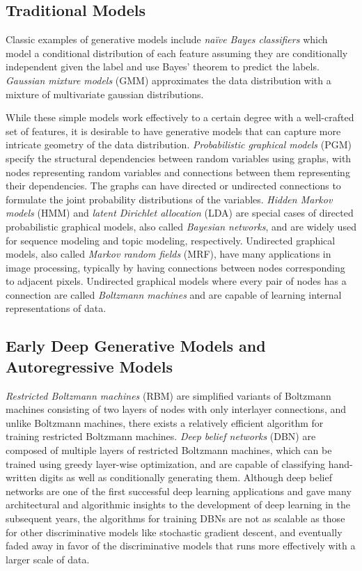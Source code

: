 \subsection{Traditional Models}

Classic examples of generative models include \emph{na\"{i}ve Bayes classifiers} \cite{maron1961naive} which model a conditional distribution of each feature assuming they are conditionally independent given the label and use Bayes' theorem to predict the labels.
\emph{Gaussian mixture models} (GMM) \cite{everitt1981mixture} approximates the data distribution with a mixture of multivariate gaussian distributions.

While these simple models work effectively to a certain degree with a well-crafted set of features, it is desirable to have generative models that can capture more intricate geometry of the data distribution.
\emph{Probabilistic graphical models} (PGM) specify the structural dependencies between random variables using graphs, with nodes representing random variables and connections between them representing their dependencies.
The graphs can have directed or undirected connections to formulate the joint probability distributions of the variables.
\emph{Hidden Markov models} (HMM) \cite{rabiner1989hmm} and \emph{latent Dirichlet allocation} (LDA) \cite{blei2003lda} are special cases of directed probabilistic graphical models, also called \emph{Bayesian networks}, and are widely used for sequence modeling and topic modeling, respectively.
Undirected graphical models, also called \emph{Markov random fields} (MRF), have many applications in image processing, typically by having connections between nodes corresponding to adjacent pixels.
Undirected graphical models where every pair of nodes has a connection are called \emph{Boltzmann machines} and are capable of learning internal representations of data.

\subsection{Early Deep Generative Models and Autoregressive Models}

\emph{Restricted Boltzmann machines} (RBM) are simplified variants of Boltzmann machines consisting of two layers of nodes with only interlayer connections, and unlike Boltzmann machines, there exists a relatively efficient algorithm \cite{hinton2005cd} for training restricted Boltzmann machines.
\emph{Deep belief networks} (DBN) \cite{hinton2006dbn} are composed of multiple layers of restricted Boltzmann machines, which can be trained using greedy layer-wise optimization, and are capable of classifying hand-written digits as well as conditionally generating them.
Although deep belief networks are one of the first successful deep learning applications and gave many architectural and algorithmic insights to the development of deep learning in the subsequent years, the algorithms for training DBNs are not as scalable as those for other discriminative models like stochastic gradient descent, and eventually faded away in favor of the discriminative models that runs more effectively with a larger scale of data.

